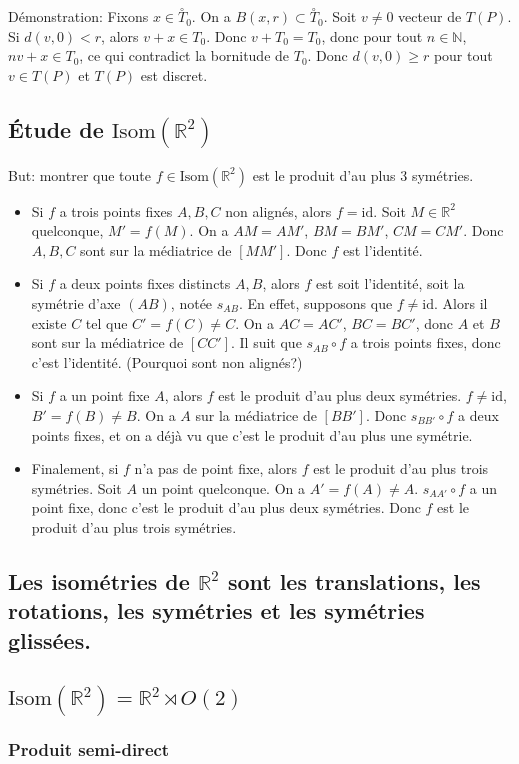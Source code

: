 \documentclass{article}
\newcommand{\R}{\mathbb{R}}
\newcommand{\N}{\mathbb{N}}
\newcommand{\interior}[1]{\overset{\circ}{#1}}
\begin{document}
Démonstration: Fixons $x \in \interior T_0$. On a $B(x, r) \subset \interior T_0$. Soit $v \ne 0$ vecteur de $T(P)$. Si $d(v, 0) < r$, alors $v + x \in T_0$. Donc $v + T_0 = T_0$, donc pour tout $n \in \N$, $nv + x \in T_0$, ce qui contradict la bornitude de $T_0$. Donc $d(v, 0) \ge r$ pour tout $v \in T(P)$ et $T(P)$ est discret.

\subsection{Étude de $\mathrm{Isom}(\R^2)$}
But: montrer que toute $f \in \mathrm{Isom}(\R^2)$ est le produit d'au plus 3 symétries.

\begin{itemize}
    \item Si $f$ a trois points fixes $A, B, C$ non alignés, alors $f = \mathrm{id}$. Soit $M \in \R^2$ quelconque, $M' = f(M)$. On a $AM = AM'$, $BM = BM'$, $CM = CM'$. Donc $A, B, C$ sont sur la médiatrice de $[MM']$. Donc $f$ est l'identité.
    \item Si $f$ a deux points fixes distincts $A, B$, alors $f$ est soit l'identité, soit la symétrie d'axe $(AB)$, notée $s_{AB}$. En effet, supposons que $f \ne \mathrm{id}$. Alors il existe $C$ tel que $C' = f(C) \ne C$. On a $AC = AC'$, $BC = BC'$, donc $A$ et $B$ sont sur la médiatrice de $[CC']$. Il suit que $s_{AB} \circ f$ a trois points fixes, donc c'est l'identité. (Pourquoi sont non alignés?)
    \item Si $f$ a un point fixe $A$, alors $f$ est le produit d'au plus deux symétries. $f \ne \mathrm{id}$, $B' = f(B) \ne B$. On a $A$ sur la médiatrice de $[BB']$. Donc $s_{BB'} \circ f$ a deux points fixes, et on a déjà vu que c'est le produit d'au plus une symétrie.
    \item Finalement, si $f$ n'a pas de point fixe, alors $f$ est le produit d'au plus trois symétries. Soit $A$ un point quelconque. On a $A' = f(A) \ne A$. $s_{AA'} \circ f$ a un point fixe, donc c'est le produit d'au plus deux symétries. Donc $f$ est le produit d'au plus trois symétries.
\end{itemize}

\subsection{Les isométries de $\R^2$ sont les translations, les rotations, les symétries et les symétries glissées.}

\subsection{$\mathrm{Isom}(\R^2) = \R^2 \rtimes O(2)$}

\subsubsection{Produit semi-direct}
\end{document}
